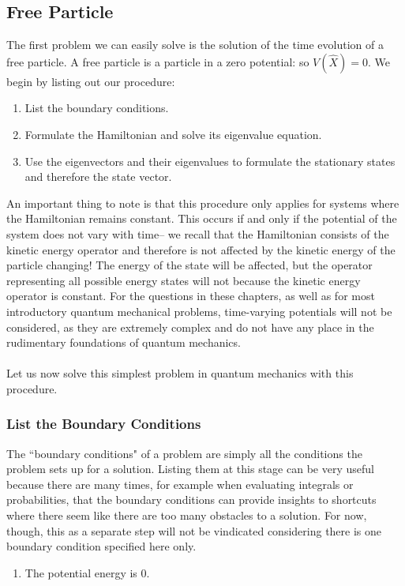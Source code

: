 \subsection{Free Particle}
The first problem we can easily solve is the solution of the time evolution of a free particle. A free particle is a particle in a zero potential: so $V(\hat{X})=0$. We begin by listing out our procedure:
\begin{enumerate}
    \item List the boundary conditions.
    \item Formulate the Hamiltonian and solve its eigenvalue equation.
    \item Use the eigenvectors and their eigenvalues to formulate the stationary states and therefore the state vector.
\end{enumerate}
An important thing to note is that this procedure only applies for systems where the Hamiltonian remains constant. This occurs if and only if the potential of the system does not vary with time-- we recall that the Hamiltonian consists of the kinetic energy operator and therefore is not affected by the kinetic energy of the particle changing! The energy of the state will be affected, but the operator representing all possible energy states will not because the kinetic energy operator is constant. For the questions in these chapters, as well as for most introductory quantum mechanical problems, time-varying potentials will not be considered, as they are extremely complex and do not have any place in the rudimentary foundations of quantum mechanics.
\\\\
Let us now solve this simplest problem in quantum mechanics with this procedure.
\subsubsection*{List the Boundary Conditions}
The ``boundary conditions" of a problem are simply all the conditions the problem sets up for a solution. Listing them at this stage can be very useful because there are many times, for example when evaluating integrals or probabilities, that the boundary conditions can provide insights to shortcuts where there seem like there are too many obstacles to a solution. For now, though, this as a separate step will not be vindicated considering there is one boundary condition specified here only.
\begin{enumerate}
    \item The potential energy is $0$.
\end{enumerate}

